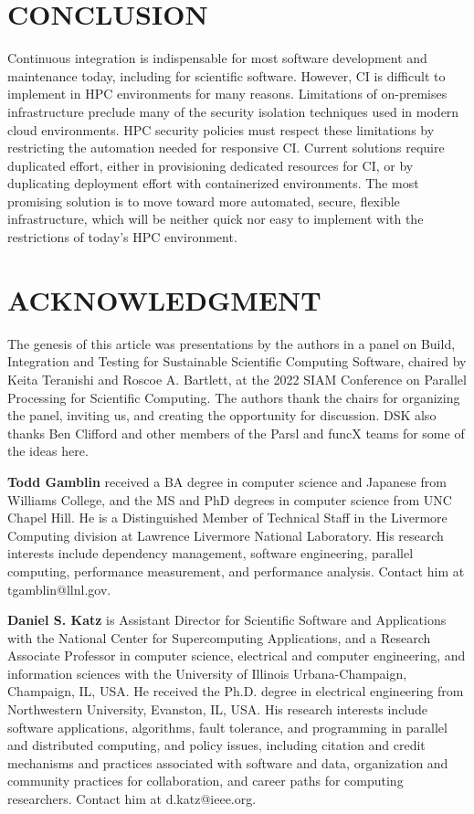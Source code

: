 \documentclass{IEEEcsmag}
\begin{document}
\section{CONCLUSION}

Continuous integration is indispensable for most software development and
maintenance today, including for scientific software.
However, CI is difficult to implement in HPC environments for many reasons.
Limitations of on-premises infrastructure preclude many of the security isolation
techniques used in modern cloud environments. HPC security policies must respect these
limitations by restricting the automation needed for responsive CI. Current solutions
require duplicated effort, either in provisioning dedicated resources for CI, or by
duplicating deployment effort with containerized environments. The most promising
solution is to move toward more automated, secure, flexible infrastructure,
which will be
neither quick nor easy to implement with the restrictions of today's HPC environment.

\section{ACKNOWLEDGMENT}

The genesis of this article was presentations by the authors in a panel on Build, Integration and Testing for
Sustainable Scientific Computing Software, chaired by Keita Teranishi and Roscoe A. Bartlett, at the 2022
SIAM Conference on Parallel Processing for Scientific Computing. The authors thank the chairs for organizing
the panel, inviting us, and creating the opportunity for discussion. DSK also thanks Ben Clifford and other
members of the Parsl and funcX teams for some of the ideas here.




\bigskip

\textbf{Todd Gamblin} received a BA degree in computer science and Japanese from Williams College, and the MS and PhD degrees in computer science from UNC Chapel Hill. He is a Distinguished Member of Technical Staff in the Livermore Computing division at Lawrence Livermore National Laboratory. His research interests include dependency management, software engineering, parallel computing, performance measurement, and performance analysis.
Contact him at tgamblin@llnl.gov.

\textbf{Daniel S. Katz} is Assistant Director for Scientific Software and Applications with the National Center for Supercomputing Applications, and a Research Associate Professor in computer science, electrical and computer engineering, and information sciences with the University of Illinois Urbana-Champaign, Champaign, IL, USA. He received the Ph.D. degree in electrical engineering from Northwestern University, Evanston, IL, USA. His research interests include software applications, algorithms, fault tolerance, and programming in parallel and distributed computing, and policy issues, including citation and credit mechanisms and practices associated with software and data, organization and community practices for collaboration, and career paths for computing researchers. 
Contact him at d.katz@ieee.org.
\end{document}

